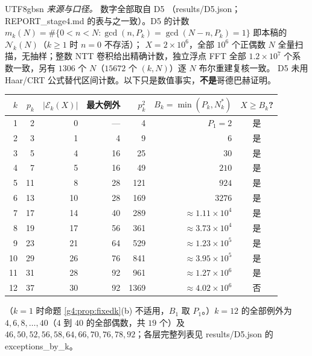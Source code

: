 \documentclass[11pt,a4paper]{article}
\newcommand{\Cnt}{\mathcal N}          %
\newcommand{\Exc}{\mathcal E}          %
\theoremstyle{plain}
\theoremstyle{definition}
\begin{document}
\begin{CJK}{UTF8}{gbsn}
\emph{来源与口径。} 数字全部取自 D5 \cite{D5}（results/D5.json；REPORT\_stage4.md 的表与之一致）。D5 的计数 $m_k(N)=\#\{0<n<N:\gcd(n,P_k)=\gcd(N-n,P_k)=1\}$ 即本稿的 $\Cnt_k(N)$（$k\ge1$ 时 $n=0$ 不存活）；
$X=2\times10^6$，全部 $10^6$ 个正偶数 $N$ 全量扫描，无抽样；整数 NTT 卷积给出精确计数，独立浮点 FFT 全部 $1.2\times10^7$ 个系数一致，另有 $1306$ 个 $N$（$15672$ 个 $(k,N)$）逐 $N$ 布尔重建复核一致。
D5 未用 Haar/CRT 公式替代区间计数。以下只是数值事实，\textbf{不是}哥德巴赫证明。

\begin{center}
\small
\begin{tabular}{rrrrrrc}
\hline
$k$ & $p_k$ & $|\Exc_k(X)|$ & 最大例外 & $p_k^2$ & $B_k=\min(P_k,N_k^*)$ & $X\ge B_k$?\\
\hline
1 & 2 & 0 & — & 4 & $P_1=2$ & 是\\
2 & 3 & 1 & 4 & 9 & $6$ & 是\\
3 & 5 & 4 & 16 & 25 & $30$ & 是\\
4 & 7 & 5 & 16 & 49 & $210$ & 是\\
5 & 11 & 8 & 28 & 121 & $924$ & 是\\
6 & 13 & 10 & 28 & 169 & $3276$ & 是\\
7 & 17 & 14 & 40 & 289 & $\approx1.11\times10^4$ & 是\\
8 & 19 & 17 & 56 & 361 & $\approx3.73\times10^4$ & 是\\
9 & 23 & 21 & 64 & 529 & $\approx1.23\times10^5$ & 是\\
10 & 29 & 26 & 76 & 841 & $\approx3.95\times10^5$ & 是\\
11 & 31 & 28 & 92 & 961 & $\approx1.27\times10^6$ & 是\\
12 & 37 & 30 & 92 & 1369 & $\approx4.02\times10^6$ & 否\\
\hline
\end{tabular}
\end{center}
（$k=1$ 时命题 \ref{g4:prop:fixedk}(b) 不适用，$B_1$ 取 $P_1$。）$k=12$ 的全部例外为
$4,6,8,\dots,40$（$4$ 到 $40$ 的全部偶数，共 $19$ 个）及 $46,50,52,56,58,64,66,70,76,78,92$；各层完整列表见 results/D5.json 的 exceptions\_by\_k。


\end{CJK}
\end{document}
